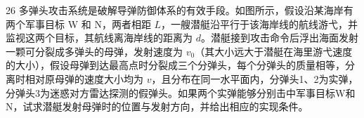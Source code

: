 \begin{problem}[理论考试][多弹头攻击系统]{26}
  多弹头攻击系统是破解导弹防御体系的有效手段。如图所示，假设沿某海岸有两个军事目标 W 和 N，两者相距 $L$，一艘潜艇沿平行于该海岸线的航线游弋，并监视这两个目标，其航线离海岸线的距离为 $d$。潜艇接到攻击命令后浮出海面发射一颗可分裂成多弹头的母弹，发射速度为 $v_{0}$（其大小远大于潜艇在海里游弋速度的大小），假设母弹到达最高点时分裂成三个分弹头，每个分弹头的质量相等，分离时相对原母弹的速度大小均为 $v$，且分布在同一水平面内，分弹头1、2为实弹，分弹头3为迷惑对方雷达探测的假弹头。如果两个实弹能够分别击中军事目标W和N，试求潜艇发射母弹时的位置与发射方向，并给出相应的实现条件。
\end{problem}